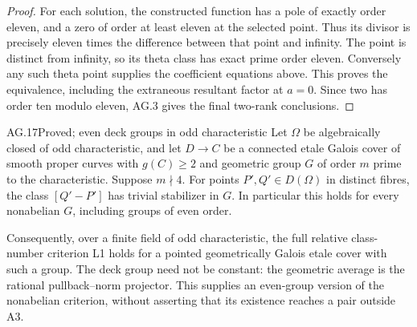 \begin{proof}
For each solution, the constructed function has a
pole of exactly order eleven, and a zero of order
at least eleven at the selected point. Thus its
divisor is precisely eleven times the difference
between that point and infinity. The point is
distinct from infinity, so its theta class has
exact prime order eleven. Conversely any such
theta point supplies the coefficient equations
above. This proves the equivalence, including
the extraneous resultant factor at $a=0$.
Since two has order ten modulo eleven, AG.3 gives
the final two-rank conclusions.
\end{proof}

\begin{claim}{AG.17}{Proved; even deck groups in odd characteristic}
Let $\Omega$ be algebraically closed of odd characteristic,
and let $D\to C$ be a connected etale Galois cover of
smooth proper curves with $g(C)\ge2$ and geometric group
$G$ of order $m$ prime to the characteristic. Suppose
$m\nmid4$. For points $P',Q'\in D(\Omega)$ in distinct
fibres, the class $[Q'-P']$ has trivial stabilizer in $G$.
In particular this holds for every nonabelian $G$,
including groups of even order.

Consequently, over a finite field of odd characteristic,
the full relative class-number criterion L1 holds for a
pointed geometrically Galois etale cover with such a group.
The deck group need not be constant: the geometric average
is the rational pullback--norm projector. This supplies
an even-group version of the nonabelian criterion, without
asserting that its existence reaches a pair outside A3.
\end{claim}

